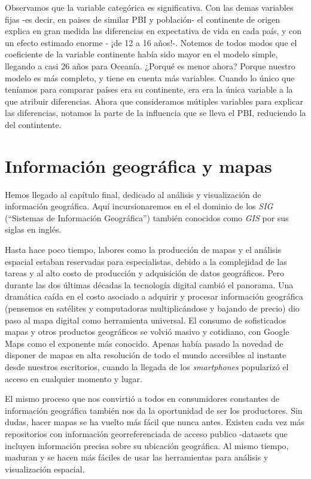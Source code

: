\documentclass[]{book}
\begin{document}
Observamos que la variable categórica es significativa. Con las demas
variables fijas -es decir, en paises de similar PBI y población- el
continente de origen explica en gran medida las diferencias en
expectativa de vida en cada país, y con un efecto estimado enorme - ¡de
12 a 16 años!-. Notemos de todos modos que el coeficiente de la variable
continente había sido mayor en el modelo simple, llegando a casi 26 años
para Oceanía. ¿Porqué es menor ahora? Porque nuestro modelo es más
completo, y tiene en cuenta más variables. Cuando lo único que teníamos
para comparar países era su continente, era era la única variable a la
que atribuir diferencias. Ahora que consideramos mútiples variables para
explicar las diferencias, notamos la parte de la influencia que se lleva
el PBI, reduciendo la del contintente.

\chapter{Información geográfica y
mapas}\label{informacion-geografica-y-mapas}

Hemos llegado al capítulo final, dedicado al análisis y visualización de
información geográfica. Aquí incursionaremos en el el dominio de los
\emph{SIG} (``Sistemas de Información Geográfica'') también conocidos
como \emph{GIS} por sus siglas en inglés.

Hasta hace poco tiempo, labores como la producción de mapas y el
análisis espacial estaban reservadas para especialistas, debido a la
complejidad de las tareas y al alto costo de producción y adquisición de
datos geográficos. Pero durante las dos últimas décadas la tecnología
digital cambió el panorama. Una dramática caída en el costo asociado a
adquirir y procesar información geográfica (pensemos en satélites y
computadoras multiplicándose y bajando de precio) dio paso al mapa
digital como herramienta universal. El consumo de sofisticados mapas y
otros productos geográficos se volvió masivo y cotidiano, con Google
Maps como el exponente más conocido. Apenas había pasado la novedad de
disponer de mapas en alta resolución de todo el mundo accesibles al
instante desde nuestros escritorios, cuando la llegada de los
\emph{smartphones} popularizó el acceso en cualquier momento y lugar.

El mismo proceso que nos convirtió a todos en consumidores constantes de
información geográfica también nos da la oportunidad de ser los
productores. Sin dudas, hacer mapas se ha vuelto más fácil que nunca
antes. Existen cada vez más repositorios con información
georreferenciada de acceso publico -datasets que incluyen información
precisa sobre su ubicación geográfica. Al mismo tiempo, maduran y se
hacen más fáciles de usar las herramientas para análisis y visualización
espacial.
\end{document}
